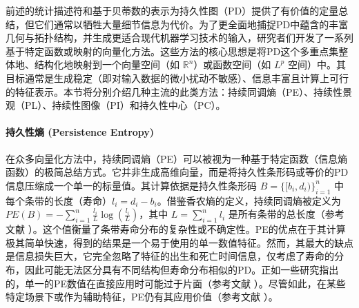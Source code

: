             前述的统计描述符和基于贝蒂数的表示为持久性图（PD）提供了有价值的定量总结，但它们通常以牺牲大量细节信息为代价。为了更全面地捕捉PD中蕴含的丰富几何与拓扑结构，并生成更适合现代机器学习技术的输入，研究者们开发了一系列基于特定函数或映射的向量化方法。这些方法的核心思想是将PD这个多重点集整体地、结构化地映射到一个向量空间（如 $\mathbb{R}^n$）或函数空间（如 $L^p$ 空间）中。其目标通常是生成稳定（即对输入数据的微小扰动不敏感）、信息丰富且计算上可行的特征表示。本节将分别介绍几种主流的此类方法：持续同调熵（PE）、持续性景观（PL）、持续性图像（PI）和持久性中心（PC）。

            \paragraph{持久性熵 (Persistence Entropy)}
            \label{sec:feat_pe}
            在众多向量化方法中，持续同调熵（PE）\cite{atienza2020stability}可以被视为一种基于特定函数（信息熵函数）的极简总结方式。它并非生成高维向量，而是将持久性条形码或等价的PD信息压缩成一个单一的标量值。其计算依据是持久性条形码 $B = \{[b_i, d_i)\}_{i=1}^n$ 中每个条带的长度（寿命）$l_i = d_i - b_i$。借鉴香农熵的定义，持续同调熵被定义为 $PE(B) = -\sum_{i=1}^{n} \frac{l_i}{L} \log(\frac{l_i}{L})$，其中 $L = \sum_{i=1}^{n} l_i$ 是所有条带的总长度（参考文献 ）。这个值衡量了条带寿命分布的复杂性或不确定性。PE的优点在于其计算极其简单快速，得到的结果是一个易于使用的单一数值特征。然而，其最大的缺点是信息损失巨大，它完全忽略了特征的出生和死亡时间信息，仅考虑了寿命的分布，因此可能无法区分具有不同结构但寿命分布相似的PD。正如一些研究指出的，单一的PE数值在直接应用时可能过于片面（参考文献 ）。尽管如此，在某些特定场景下或作为辅助特征，PE仍有其应用价值（参考文献 ）。

